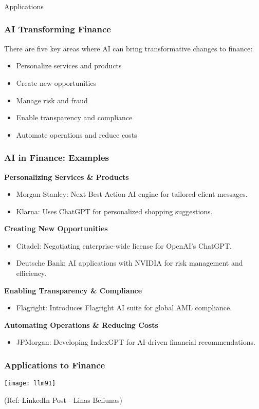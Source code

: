 \begin{frame}[fragile]\frametitle{}
\begin{center}
{\Large Applications}
\end{center}
\end{frame}

\begin{frame}[fragile]\frametitle{AI Transforming Finance}
There are five key areas where AI can bring transformative changes to finance:
\begin{itemize}
    \item Personalize services and products
    \item Create new opportunities
    \item Manage risk and fraud
    \item Enable transparency and compliance
    \item Automate operations and reduce costs
\end{itemize}
\end{frame}

\begin{frame}[fragile]\frametitle{AI in Finance: Examples}
\textbf{Personalizing Services \& Products}
\begin{itemize}
    \item Morgan Stanley: Next Best Action AI engine for tailored client messages.
    \item Klarna: Uses ChatGPT for personalized shopping suggestions.
\end{itemize}

\textbf{Creating New Opportunities}
\begin{itemize}
    \item Citadel: Negotiating enterprise-wide license for OpenAI's ChatGPT.
    \item Deutsche Bank: AI applications with NVIDIA for risk management and efficiency.
\end{itemize}

\textbf{Enabling Transparency \& Compliance}
\begin{itemize}
    \item Flagright: Introduces Flagright AI suite for global AML compliance.
\end{itemize}

\textbf{Automating Operations \& Reducing Costs}
\begin{itemize}
    \item JPMorgan: Developing IndexGPT for AI-driven financial recommendations.
\end{itemize}
\end{frame}


\begin{frame}[fragile]\frametitle{Applications to Finance}
\begin{center}
\texttt{[image: llm91]}
\end{center}

{\tiny (Ref: LinkedIn Post - Linas Beliunas)}
\end{frame}
